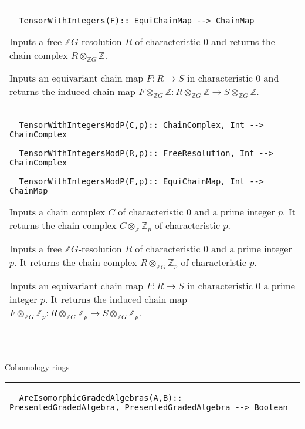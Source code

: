 \documentclass[a4paper,11pt]{report}
\begin{document}
{\begin{center}
\begin{tabular}{|l|}
\begin{verbatim}  TensorWithIntegers(F):: EquiChainMap --> ChainMap
\end{verbatim}


 

 Inputs a free $\mathbb ZG$-resolution $R$ of characteristic $0$ and returns the chain complex $R \otimes_{\mathbb ZG} {\mathbb Z}$. 

 Inputs an equivariant chain map $F\colon R \rightarrow S$ in characteristic $0$ and returns the induced chain map $F\otimes_{\mathbb ZG}\mathbb Z \colon R \otimes_{\mathbb ZG} {\mathbb Z}
\longrightarrow S \otimes_{\mathbb ZG} {\mathbb Z}$. \\
 \index{TensorWithIntegersModP} 
\begin{verbatim}  TensorWithIntegersModP(C,p):: ChainComplex, Int --> ChainComplex
\end{verbatim}
 
\begin{verbatim}  TensorWithIntegersModP(R,p):: FreeResolution, Int --> ChainComplex
\end{verbatim}
 
\begin{verbatim}  TensorWithIntegersModP(F,p):: EquiChainMap, Int --> ChainMap
\end{verbatim}


 

 Inputs a chain complex $C$ of characteristic $0$ and a prime integer $p$. It returns the chain complex $C \otimes_{\mathbb Z} {\mathbb Z}_p$ of characteristic $p$. 

 Inputs a free $\mathbb ZG$-resolution $R$ of characteristic $0$ and a prime integer $p$. It returns the chain complex $R \otimes_{\mathbb ZG} {\mathbb Z}_p$ of characteristic $p$. 

 Inputs an equivariant chain map $F\colon R \rightarrow S$ in characteristic $0$ a prime integer $p$. It returns the induced chain map $F\otimes_{\mathbb ZG}\mathbb Z_p \colon R \otimes_{\mathbb ZG} {\mathbb Z}_p
\longrightarrow S \otimes_{\mathbb ZG} {\mathbb Z}_p$. \\
\end{tabular}\\[2mm]
\end{center}

 Cohomology rings \begin{center}
\begin{tabular}{|l|} \index{AreIsomorphicGradedAlgebras} 
\begin{verbatim}  AreIsomorphicGradedAlgebras(A,B):: PresentedGradedAlgebra, PresentedGradedAlgebra --> Boolean
\end{verbatim}



\end{tabular}
\end{center}}
\end{document}
